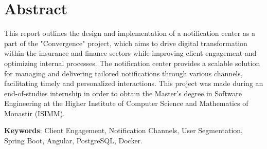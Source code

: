 \chapter*{Abstract}
\thispagestyle{empty}

This report outlines the design and implementation of a notification center
as a part of the "Convergence" project, which aims to drive digital transformation
within the insurance and finance sectors while improving client engagement and
optimizing internal processes. The notification center provides a scalable solution
for managing and delivering tailored notifications through various channels,
facilitating timely and personalized interactions. This project was made during an
end-of-studies internship in order to obtain the Master's degree in Software Engineering
at the Higher Institute of Computer Science and Mathematics of Monastir (ISIMM).

\vspace{2cm}
\noindent\textbf{Keywords}: Client Engagement, Notification Channels, User Segmentation,
Spring Boot, Angular, PostgreSQL, Docker.
\cleardoublepage